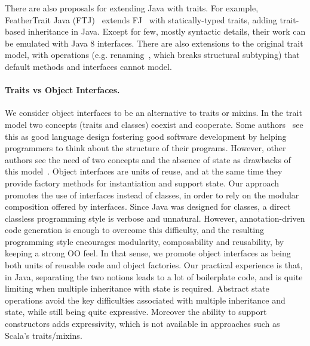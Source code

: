There are also proposals for extending Java with traits. For
example, FeatherTrait Java (FTJ)~\cite{Liquori08ftj} extends
FJ~\cite{Igarashi01FJ} with statically-typed traits, adding trait-based
inheritance in Java.  Except for few, mostly syntactic details, their work can
be emulated with Java 8 interfaces. There are also extensions to the original
trait model, with operations (e.g. renaming~\cite{reppy2006foundation}, which breaks
structural subtyping) that default methods and interfaces cannot
model.

\paragraph{Traits vs Object Interfaces.}
We consider object interfaces to be an alternative to traits or mixins.  In the
trait model two concepts (traits and classes) coexist and cooperate. Some
authors~\cite{BettiniDSS13} see this as good language design fostering good
software development by helping programmers to think about the structure of
their programs.  However, other authors see the need of two concepts and the
absence of state as drawbacks of this model~\cite{malayeri2009cz}.  Object
interfaces are units of reuse, and at the same time they provide factory methods
for instantiation and support state.  Our approach promotes the use of
interfaces instead of classes, in order to rely on the modular composition
offered by interfaces. Since Java was designed for classes, a direct classless
programming style is verbose and unnatural. However, annotation-driven code
generation is enough to overcome this difficulty, and the resulting programming
style encourages modularity, composability and reusability, by keeping a strong
OO feel. In that sense, we promote object interfaces as being both units of
reusable code and object factories. Our practical experience is that, in Java,
separating the two notions leads to a lot of boilerplate code, and is quite
limiting when multiple inheritance with state is required.  Abstract state
operations avoid the key difficulties associated with multiple inheritance and
state, while still being quite expressive.  Moreover the ability to support
constructors adds expressivity, which is not available in approaches
such as Scala's traits/mixins.


